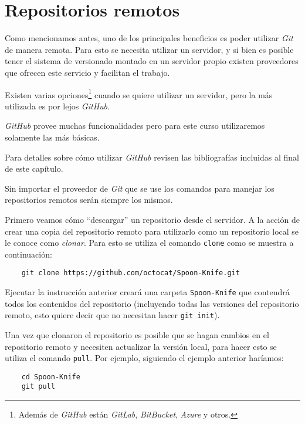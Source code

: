 \section{Repositorios remotos}
  \label{sec:github}

  Como mencionamos antes, uno de los principales beneficios es poder utilizar \textit{Git} de manera
  remota.
  Para esto se necesita utilizar un servidor, y si bien es posible tener el sistema de versionado
  montado en un servidor propio existen proveedores que ofrecen este servicio y facilitan el 
  trabajo.

  Existen varias opciones\footnote{Además de \textit{GitHub} están \textit{GitLab}, 
  \textit{BitBucket}, \textit{Azure} y otros.} cuando se quiere utilizar un servidor, pero la más 
  utilizada es por lejos \textit{GitHub}.\autocite{vcs-providers}

  \textit{GitHub} provee muchas funcionalidades pero para este curso utilizaremos solamente las más
  básicas.

  Para detalles sobre cómo utilizar \textit{GitHub} revisen las bibliografías incluidas al final de
  este capítulo.

  Sin importar el proveedor de \textit{Git} que se use los comandos para manejar los repositorios 
  remotos serán siempre los mismos.

  Primero veamos cómo \enquote{descargar} un repositorio desde el servidor.
  A la acción de crear una copia del repositorio remoto para utilizarlo como un repositorio local se
  le conoce como \textit{clonar}.
  Para esto se utiliza el comando \texttt{clone} como se muestra a continuación:
  \begin{verbatim}
    git clone https://github.com/octocat/Spoon-Knife.git
  \end{verbatim}

  Ejecutar la instrucción anterior creará una carpeta \texttt{Spoon-Knife} que contendrá todos los
  contenidos del repositorio (incluyendo todas las versiones del repositorio remoto, esto quiere 
  decir que no necesitan hacer \texttt{git init}).

  Una vez que clonaron el repositorio es posible que se hagan cambios en el repositorio remoto y 
  necesiten actualizar la versión local, para hacer esto se utiliza el comando \texttt{pull}.
  Por ejemplo, siguiendo el ejemplo anterior haríamos:
  \begin{verbatim}
    cd Spoon-Knife
    git pull
  \end{verbatim}
